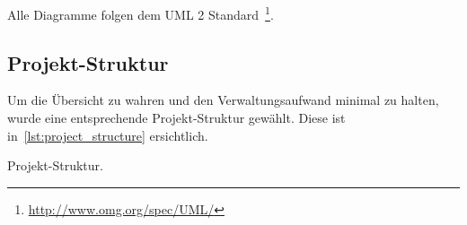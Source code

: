 Alle Diagramme folgen dem UML 2 Standard~\footnote{
    \href{http://www.omg.org/spec/UML/}{http://www.omg.org/spec/UML/}}.

\subsection{Projekt-Struktur}
\label{subsec:standards_guidelines:project_structure}

Um die Übersicht zu wahren und den Verwaltungsaufwand minimal zu halten,
wurde eine entsprechende Projekt-Struktur gewählt. Diese ist
in~\autoref{lst:project_structure} ersichtlich.

\begin{listing}
    \caption{Projekt-Struktur.}\label{lst:project_structure}
\end{listing}
